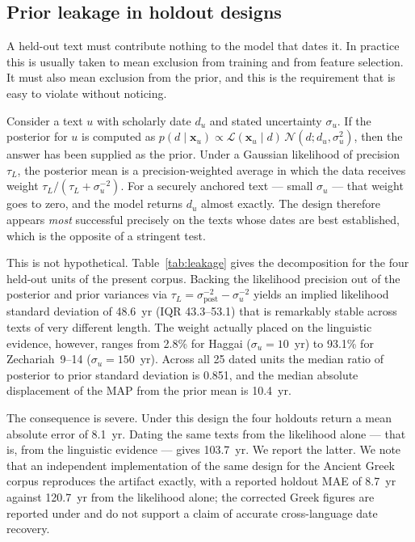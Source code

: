 \documentclass[10pt,letterpaper]{article}
\begin{document}
\subsection*{Prior leakage in holdout designs}

A held-out text must contribute nothing to the model that dates it.  In
practice this is usually taken to mean exclusion from training and from
feature selection.  It must also mean exclusion from the prior, and this is
the requirement that is easy to violate without noticing.

Consider a text $u$ with scholarly date $d_u$ and stated uncertainty
$\sigma_u$.  If the posterior for $u$ is computed as
$p(d \mid \mathbf{x}_u) \propto \mathcal{L}(\mathbf{x}_u \mid d)\,
\mathcal{N}(d; d_u, \sigma_u^2)$, then the answer has been supplied as the
prior.  Under a Gaussian likelihood of precision $\tau_L$, the posterior
mean is a precision-weighted average in which the data receives weight
$\tau_L / (\tau_L + \sigma_u^{-2})$.  For a securely anchored text ---
small $\sigma_u$ --- that weight goes to zero, and the model returns
$d_u$ almost exactly.  The design therefore appears \emph{most} successful
precisely on the texts whose dates are best established, which is the
opposite of a stringent test.

This is not hypothetical.  Table~\ref{tab:leakage} gives the decomposition
for the four held-out units of the present corpus.  Backing the likelihood
precision out of the posterior and prior variances via
$\tau_L = \sigma_{\text{post}}^{-2} - \sigma_u^{-2}$ yields an implied
likelihood standard deviation of 48.6~yr (IQR 43.3--53.1) that is
remarkably stable across texts of very different length.  The weight
actually placed on the linguistic evidence, however, ranges from 2.8\% for
Haggai ($\sigma_u = 10$~yr) to 93.1\% for Zechariah~9--14
($\sigma_u = 150$~yr).  Across all 25 dated units the median ratio of
posterior to prior standard deviation is 0.851, and the median absolute
displacement of the MAP from the prior mean is 10.4~yr.

The consequence is severe.  Under this design the four holdouts return a
mean absolute error of 8.1~yr.  Dating the same texts from the likelihood
alone --- that is, from the linguistic evidence --- gives 103.7~yr.  We
report the latter.  We note that an independent implementation of the same
design for the Ancient Greek corpus reproduces the artifact exactly, with a
reported holdout MAE of 8.7~yr against 120.7~yr from the likelihood alone;
the corrected Greek figures are reported under
 and do not support a claim of accurate cross-language
date recovery.
\end{document}
